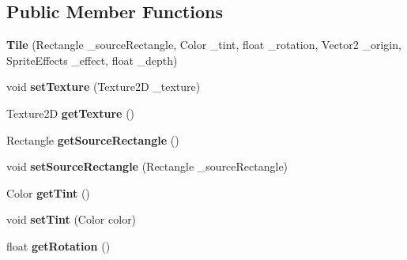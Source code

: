 \subsection*{Public Member Functions}
\begin{DoxyCompactItemize}
\item 
\hypertarget{class_tile_engine_1_1_tile_a51f908f77d3210fd3397a844d90dbdb2}{{\bfseries Tile} (Rectangle \-\_\-source\-Rectangle, Color \-\_\-tint, float \-\_\-rotation, Vector2 \-\_\-origin, Sprite\-Effects \-\_\-effect, float \-\_\-depth)}\label{class_tile_engine_1_1_tile_a51f908f77d3210fd3397a844d90dbdb2}

\item 
\hypertarget{class_tile_engine_1_1_tile_aaf5725a5761dda6ed078ef8825167124}{void {\bfseries set\-Texture} (Texture2\-D \-\_\-texture)}\label{class_tile_engine_1_1_tile_aaf5725a5761dda6ed078ef8825167124}

\item 
\hypertarget{class_tile_engine_1_1_tile_a539bc2583deb9ea015d2d9ac39ef6531}{Texture2\-D {\bfseries get\-Texture} ()}\label{class_tile_engine_1_1_tile_a539bc2583deb9ea015d2d9ac39ef6531}

\item 
\hypertarget{class_tile_engine_1_1_tile_a6c32d6adf8a567aee16e30c311f8d7a4}{Rectangle {\bfseries get\-Source\-Rectangle} ()}\label{class_tile_engine_1_1_tile_a6c32d6adf8a567aee16e30c311f8d7a4}

\item 
\hypertarget{class_tile_engine_1_1_tile_ad4ef504ed53ad6b2f5c7155d765d9d74}{void {\bfseries set\-Source\-Rectangle} (Rectangle \-\_\-source\-Rectangle)}\label{class_tile_engine_1_1_tile_ad4ef504ed53ad6b2f5c7155d765d9d74}

\item 
\hypertarget{class_tile_engine_1_1_tile_a8a2254bf9d9d822f1ca42d32b9f88b2d}{Color {\bfseries get\-Tint} ()}\label{class_tile_engine_1_1_tile_a8a2254bf9d9d822f1ca42d32b9f88b2d}

\item 
\hypertarget{class_tile_engine_1_1_tile_acd94a9cd2f8641284afd91c8ccd60119}{void {\bfseries set\-Tint} (Color color)}\label{class_tile_engine_1_1_tile_acd94a9cd2f8641284afd91c8ccd60119}

\item 
\hypertarget{class_tile_engine_1_1_tile_a37fd2a1887b7961fec064bd32f7aed94}{float {\bfseries get\-Rotation} ()}\label{class_tile_engine_1_1_tile_a37fd2a1887b7961fec064bd32f7aed94}


\end{DoxyCompactItemize}
